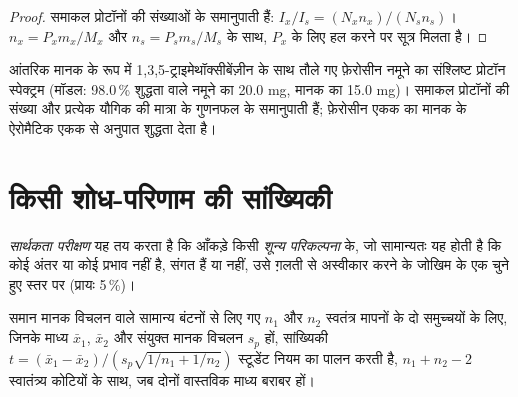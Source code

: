 \begin{proof}
समाकल प्रोटॉनों की संख्याओं के समानुपाती हैं: $I_x/I_s = (N_xn_x)/(N_sn_s)$।
$n_x = P_xm_x/M_x$ और $n_s = P_sm_s/M_s$ के साथ, $P_x$ के लिए हल करने पर सूत्र मिलता है।
\end{proof}

\begin{omfigure}

{\small आंतरिक मानक के रूप में 1,3,5-ट्राइमेथॉक्सीबेंज़ीन के साथ तौले गए फ़ेरोसीन नमूने का
संश्लिष्ट प्रोटॉन स्पेक्ट्रम (मॉडल: 98.0\,\% शुद्धता वाले नमूने का 20.0 mg,
मानक का 15.0 mg)। समाकल प्रोटॉनों की संख्या और प्रत्येक यौगिक की
मात्रा के गुणनफल के समानुपाती हैं; फ़ेरोसीन एकक का
मानक के ऐरोमैटिक एकक से अनुपात शुद्धता देता है।}
\end{omfigure}

\section{किसी शोध-परिणाम की सांख्यिकी}

\begin{definition}[सार्थकता परीक्षण]\label{def:b3:lab-techniques-3:tests}
\emph{सार्थकता परीक्षण} यह तय करता है कि आँकड़े किसी
\emph{शून्य परिकल्पना} के, जो सामान्यतः यह होती है कि
कोई अंतर या कोई प्रभाव नहीं है, संगत हैं या नहीं, उसे ग़लती से अस्वीकार करने के जोखिम के
एक चुने हुए स्तर पर (प्रायः 5\,\%)।
\end{definition}

\begin{theorem}[दो-प्रतिदर्श $t$ परीक्षण]\label{thm:b3:lab-techniques-3:t-test}
समान मानक विचलन वाले सामान्य बंटनों से लिए गए $n_1$ और $n_2$ स्वतंत्र मापनों के
दो समुच्चयों के लिए, जिनके माध्य $\bar x_1$, $\bar x_2$ और संयुक्त
मानक विचलन $s_p$ हों, सांख्यिकी $t = (\bar x_1 - \bar x_2)/(s_p\sqrt{1/n_1 + 1/n_2})$ स्टूडेंट नियम का पालन करती है,
$n_1 + n_2 - 2$ स्वातंत्र्य कोटियों के साथ, जब दोनों वास्तविक माध्य बराबर हों। \admitted
\end{theorem}

